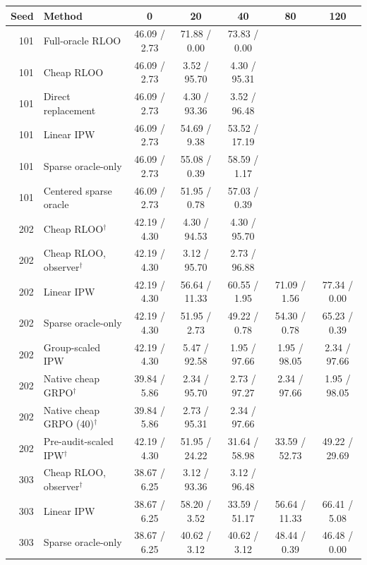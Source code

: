 \begin{tabular}{rlccccc}
\toprule
Seed & Method & 0 & 20 & 40 & 80 & 120 \\
\midrule
101 & Full-oracle RLOO & 46.09 / 2.73 & 71.88 / 0.00 & 73.83 / 0.00 &  &  \\
101 & Cheap RLOO & 46.09 / 2.73 & 3.52 / 95.70 & 4.30 / 95.31 &  &  \\
101 & Direct replacement & 46.09 / 2.73 & 4.30 / 93.36 & 3.52 / 96.48 &  &  \\
101 & Linear IPW & 46.09 / 2.73 & 54.69 / 9.38 & 53.52 / 17.19 &  &  \\
101 & Sparse oracle-only & 46.09 / 2.73 & 55.08 / 0.39 & 58.59 / 1.17 &  &  \\
101 & Centered sparse oracle & 46.09 / 2.73 & 51.95 / 0.78 & 57.03 / 0.39 &  &  \\
\midrule
202 & Cheap RLOO$^\dagger$ & 42.19 / 4.30 & 4.30 / 94.53 & 4.30 / 95.70 &  &  \\
202 & Cheap RLOO, observer$^\dagger$ & 42.19 / 4.30 & 3.12 / 95.70 & 2.73 / 96.88 &  &  \\
202 & Linear IPW & 42.19 / 4.30 & 56.64 / 11.33 & 60.55 / 1.95 & 71.09 / 1.56 & 77.34 / 0.00 \\
202 & Sparse oracle-only & 42.19 / 4.30 & 51.95 / 2.73 & 49.22 / 0.78 & 54.30 / 0.78 & 65.23 / 0.39 \\
202 & Group-scaled IPW & 42.19 / 4.30 & 5.47 / 92.58 & 1.95 / 97.66 & 1.95 / 98.05 & 2.34 / 97.66 \\
202 & Native cheap GRPO$^\dagger$ & 39.84 / 5.86 & 2.34 / 95.70 & 2.73 / 97.27 & 2.34 / 97.66 & 1.95 / 98.05 \\
202 & Native cheap GRPO (40)$^\dagger$ & 39.84 / 5.86 & 2.73 / 95.31 & 2.34 / 97.66 &  &  \\
202 & Pre-audit-scaled IPW$^\dagger$ & 42.19 / 4.30 & 51.95 / 24.22 & 31.64 / 58.98 & 33.59 / 52.73 & 49.22 / 29.69 \\
\midrule
303 & Cheap RLOO, observer$^\dagger$ & 38.67 / 6.25 & 3.12 / 93.36 & 3.12 / 96.48 &  &  \\
303 & Linear IPW & 38.67 / 6.25 & 58.20 / 3.52 & 33.59 / 51.17 & 56.64 / 11.33 & 66.41 / 5.08 \\
303 & Sparse oracle-only & 38.67 / 6.25 & 40.62 / 3.12 & 40.62 / 3.12 & 48.44 / 0.39 & 46.48 / 0.00 \\

\end{tabular}
